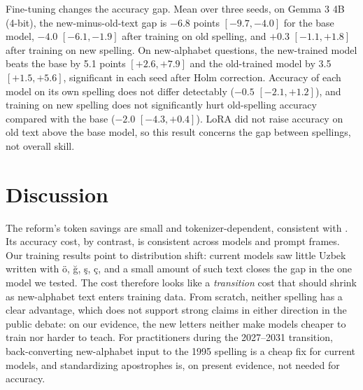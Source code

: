 Fine-tuning changes the accuracy gap. Mean over three seeds, on Gemma 3 4B (4-bit), the new-minus-old-text gap is $-6.8$ points $[-9.7, -4.0]$ for the base model, $-4.0$ $[-6.1, -1.9]$ after training on old spelling, and $+0.3$ $[-1.1, +1.8]$ after training on new spelling. On new-alphabet questions, the new-trained model beats the base by 5.1 points $[+2.6, +7.9]$ and the old-trained model by 3.5 $[+1.5, +5.6]$, significant in each seed after Holm correction. Accuracy of each model on its own spelling does not differ detectably ($-0.5$ $[-2.1, +1.2]$), and training on new spelling does not significantly hurt old-spelling accuracy compared with the base ($-2.0$ $[-4.3, +0.4]$). LoRA did not raise accuracy on old text above the base model, so this result concerns the gap between spellings, not overall skill.

\section{Discussion}
The reform's token savings are small and tokenizer-dependent, consistent with \citet{ibadullaev2026}. Its accuracy cost, by contrast, is consistent across models and prompt frames. Our training results point to distribution shift: current models saw little Uzbek written with \"o, \u{g}, \c{s}, \c{c}, and a small amount of such text closes the gap in the one model we tested. The cost therefore looks like a \emph{transition} cost that should shrink as new-alphabet text enters training data. From scratch, neither spelling has a clear advantage, which does not support strong claims in either direction in the public debate: on our evidence, the new letters neither make models cheaper to train nor harder to teach. For practitioners during the 2027--2031 transition, back-converting new-alphabet input to the 1995 spelling is a cheap fix for current models, and standardizing apostrophes is, on present evidence, not needed for accuracy.

